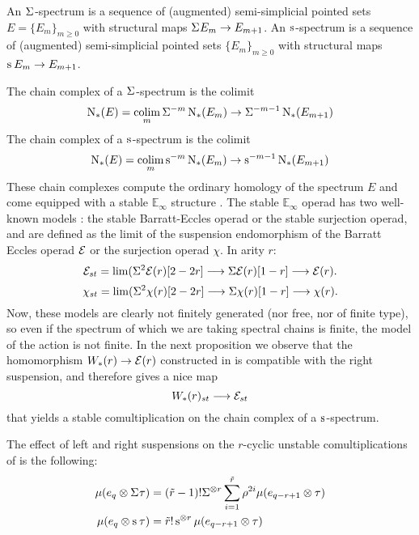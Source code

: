 An $\Sigma^{}$-spectrum is a sequence of (augmented) semi-simplicial pointed sets $E = \{E_m\}_{m\geq 0}$ with structural maps $\Sigma^{} E_m\to E_{m+1}$. An $\operatorname{s}^{}$-spectrum is a sequence of (augmented) semi-simplicial pointed sets $\{E_m\}_{m\geq 0}$ with structural maps $\operatorname{s}^{} E_m\to E_{m+1}$.

The chain complex of a $\Sigma^{}$-spectrum is the colimit
\[
    \operatorname{N}_{*}(E) = \operatorname*{colim}_m \Sigma^{-m} \operatorname{N}_{*}(E_m)\to \Sigma^{-m-1} \operatorname{N}_{*}(E_{m+1})
\]
The chain complex of a $\operatorname{s}^{}$-spectrum is the colimit
\[
    \operatorname{N}_{*}(E) = \operatorname*{colim}_m \operatorname{s}^{-m} \operatorname{N}_{*}(E_m)\to \operatorname{s}^{-m-1} \operatorname{N}_{*}(E_{m+1})
\]
These chain complexes compute the ordinary homology of the spectrum $E$ and come equipped with a stable $\mathbb{E}_\infty$ structure \cite{Gill2020}. The stable $\mathbb{E}_\infty$ operad has two well-known models \cite[Appendix]{berger2004combinatorial}: the stable Barratt-Eccles operad or the stable surjection operad, and are defined as the limit of the suspension endomorphism of the Barratt Eccles operad $\mathcal{E}$ or the surjection operad $\chi$. In arity $r$:
\[\mathcal{E}_{st} = \lim(  \Sigma^2\mathcal{E}(r)[2-2r] \longrightarrow \Sigma \mathcal{E}(r)[1-r]\longrightarrow \mathcal{E}(r).\]
\[\chi_{st} = \lim(  \Sigma^2\chi(r)[2-2r] \longrightarrow \Sigma \chi(r)[1-r]\longrightarrow \chi(r).\]
Now, these models are clearly not finitely generated (nor free, nor of finite type), so even if the spectrum of which we are taking spectral chains is finite, the model of the action is not finite. In the next proposition we observe that the homomorphism $W_*(r)\to \mathcal{E}(r)$ constructed in \cite{medina2021may_st} is compatible with the right suspension, and therefore gives a nice map
\[
    W_*(r)_{st}\longrightarrow \mathcal{E}_{st}
\]
that yields a stable comultiplication on the chain complex of a $\operatorname{s}^{}$-spectrum.

\begin{proposition}\label{prop:suspensionunstable}
    The effect of left and right suspensions on the $r$-cyclic unstable comultiplications of \cite{medina2021may_st} is the following:
    \begin{align*}
        \mu(e_q \otimes  \Sigma^{} \tau) &= (\tilde{r}-1)!\Sigma^{ \otimes  r}\sum_{i=1}^{\tilde{r}} \rho^{2i}\mu(e_{q-r+1} \otimes  \tau)
        \\
       \mu(e_q \otimes  \operatorname{s}^{}\tau) &= \tilde{r}!\operatorname{s}^{ \otimes  r}\mu(e_{q-r+1} \otimes  \tau)
    \end{align*}
\end{proposition}

